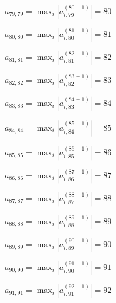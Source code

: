 \documentclass[a4paper,12pt]{article}
\begin{document}
$a _{ 79, 79 } =  \max _i |a _{ i, 79 } ^{ (80 - 1) } | = 80$

$a _{ 80, 80 } =  \max _i |a _{ i, 80 } ^{ (81 - 1) } | = 81$

$a _{ 81, 81 } =  \max _i |a _{ i, 81 } ^{ (82 - 1) } | = 82$

$a _{ 82, 82 } =  \max _i |a _{ i, 82 } ^{ (83 - 1) } | = 83$

$a _{ 83, 83 } =  \max _i |a _{ i, 83 } ^{ (84 - 1) } | = 84$

$a _{ 84, 84 } =  \max _i |a _{ i, 84 } ^{ (85 - 1) } | = 85$

$a _{ 85, 85 } =  \max _i |a _{ i, 85 } ^{ (86 - 1) } | = 86$

$a _{ 86, 86 } =  \max _i |a _{ i, 86 } ^{ (87 - 1) } | = 87$

$a _{ 87, 87 } =  \max _i |a _{ i, 87 } ^{ (88 - 1) } | = 88$

$a _{ 88, 88 } =  \max _i |a _{ i, 88 } ^{ (89 - 1) } | = 89$

$a _{ 89, 89 } =  \max _i |a _{ i, 89 } ^{ (90 - 1) } | = 90$

$a _{ 90, 90 } =  \max _i |a _{ i, 90 } ^{ (91 - 1) } | = 91$

$a _{ 91, 91 } =  \max _i |a _{ i, 91 } ^{ (92 - 1) } | = 92$
\end{document}
